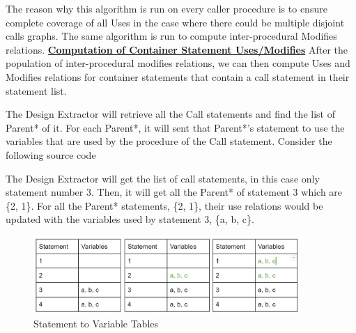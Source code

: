 \documentclass[12pt]{article}
\begin{document}
{{{{{{{{{{{{{The reason why this algorithm is run on every caller procedure is to ensure complete coverage of all Uses in the case where there could be multiple disjoint calls graphs. The same algorithm is run to compute inter-procedural Modifies relations.
\vspace{4mm}\newline
\textbf{\underline{Computation of Container Statement Uses/Modifies}}\newline
After the population of inter-procedural modifies relations, we can then compute Uses and Modifies relations for container statements that contain a call statement in their statement list.

The Design Extractor will retrieve all the Call statements and find the list of Parent* of it. For each Parent*, it will sent that Parent*’s statement to use the variables that are used by the procedure of the Call statement. \newline Consider the following source code
\begin{center}
\end{center}
\vspace{10mm}
The Design Extractor will get the list of call statements, in this case only statement number 3. Then, it will get all the Parent* of statement 3 which are \{2, 1\}. For all the Parent* statements, \{2, 1\}, their use relations would be updated with the variables used by statement 3, \{a, b, c\}.
\begin{figure}[htbp]
  \caption{Statement to Variable Tables}
  \centering  \includegraphics[width=0.9\textwidth]{uses_propagating.png}
\end{figure}
\vspace{4mm}

}}}}}}}}}}}}}
\end{document}
